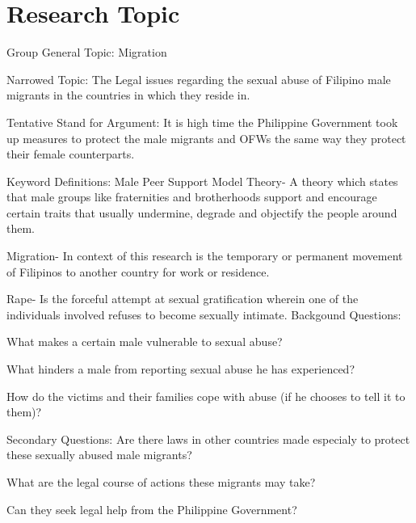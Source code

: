 \section{Research Topic}

	\noindent Group General Topic: Migration

	\noindent  Narrowed Topic: The Legal issues regarding the sexual abuse of Filipino male migrants in the countries in which they reside in.

	\noindent Tentative Stand for Argument: It is high time the Philippine Government took up measures to protect the male migrants and OFWs the same way they protect their female counterparts.


	\begin{outline}
	 \1 Keyword Definitions:
	 \2 Male Peer Support Model Theory- A theory which states that male groups like fraternities and brotherhoods support and encourage certain traits that usually undermine, degrade and objectify the people around them.

	 \2 Migration- In context of this research is the temporary or permanent movement of Filipinos to another country for work or residence.
	
	 \2 Rape- Is the forceful attempt at sexual gratification wherein one of the individuals involved refuses to become sexually intimate.
	\1 Backgound Questions:

	\2 What makes a certain male vulnerable to sexual abuse?

	\2 What hinders a male from reporting sexual abuse he has experienced?

	\2 How do the victims and their families cope with abuse (if he chooses to tell it to them)?

	\1 Secondary Questions:	
	\2 Are there laws in other countries made especialy to protect these sexually abused male migrants?

	\2 What are the legal course of actions these migrants may take?

	\2 Can they seek legal help from the Philippine Government?
	

	\end{outline}
